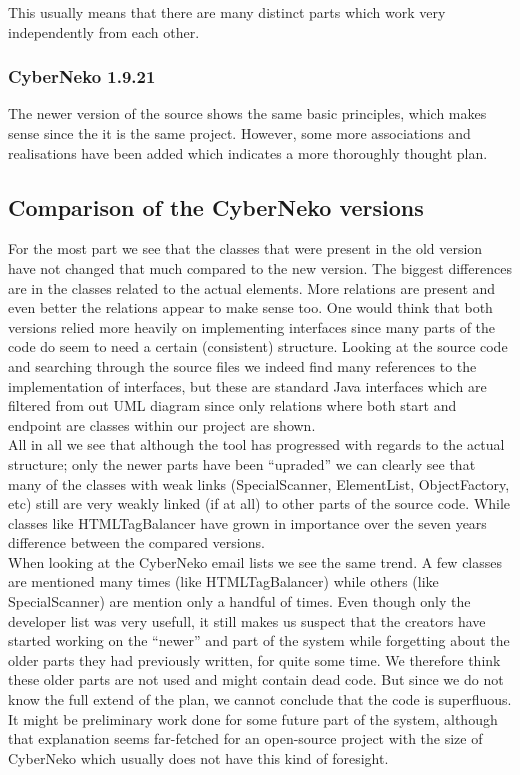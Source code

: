\documentclass[a4paper,twoside,11pt]{article}
\begin{document}
This usually means that there are many distinct parts which work very independently from each other. 

\subsubsection{CyberNeko 1.9.21}
\label{sec:cyberneko1921}
The newer version of the source shows the same basic principles, which makes sense since the it is the same project. However, some more associations and realisations have been added which indicates a more thoroughly thought plan.

\subsection{Comparison of the CyberNeko versions}
\label{sec:comparison}
For the most part we see that the classes that were present in the old version have not changed that much compared to the new version. The biggest differences are in the classes related to the actual elements. More relations are present and even better the relations appear to make sense too. One would think that both versions relied more heavily on implementing interfaces since many parts of the code do seem to need a certain (consistent) structure. Looking at the source code and searching through the source files we indeed find many references to the implementation of interfaces, but these are standard Java interfaces which are filtered from out UML diagram since only relations where both start and endpoint are classes within our project are shown. \\

All in all we see that although the tool has progressed with regards to the actual structure; only the newer parts have been ``upraded'' we can clearly see that many of the classes with weak links ({\sc SpecialScanner, ElementList, ObjectFactory,} etc) still are very weakly linked (if at all) to other parts of the source code. While classes like {\sc HTMLTagBalancer} have grown in importance over the seven years difference between the compared versions. \\

When looking at the CyberNeko email lists we see the same trend. A few classes are mentioned many times (like {\sc HTMLTagBalancer}) while others (like {\sc SpecialScanner}) are mention only a handful of times. Even though only the developer list was very usefull, it still makes us suspect that the creators have started working on the ``newer'' and part of the system while forgetting about the older parts they had previously written, for quite some time. We therefore think these older parts are not used and might contain dead code. But since we do not know the full extend of the plan, we cannot conclude that the code is superfluous. It might be preliminary work done for some future part of the system, although that explanation seems far-fetched for an open-source project with the size of CyberNeko which usually does not have this kind of foresight. \\
\end{document}
